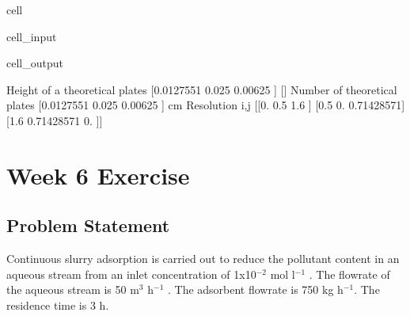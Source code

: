 \documentclass[letterpaper,10pt,english]{jupyterBook}
\begin{document}
\begin{sphinxuseclass}{cell}
\begin{sphinxVerbatimInput}
\begin{sphinxuseclass}{cell_input}
\begin{sphinxVerbatim}[commandchars=\\\{\}]
\end{sphinxVerbatim}

\end{sphinxuseclass}\end{sphinxVerbatimInput}
\begin{sphinxVerbatimOutput}

\begin{sphinxuseclass}{cell_output}
\begin{sphinxVerbatim}[commandchars=\\\{\}]
Height of a theoretical plates  [0.0127551 0.025     0.00625  ]  [\PYGZhy{}]
Number of theoretical plates  [0.0127551 0.025     0.00625  ]  cm
Resolution i,j
 [[0.         0.5        1.6       ]
 [0.5        0.         0.71428571]
 [1.6        0.71428571 0.        ]]
\end{sphinxVerbatim}

\end{sphinxuseclass}\end{sphinxVerbatimOutput}

\end{sphinxuseclass}
\sphinxstepscope


\section{Week 6 \sphinxhyphen{} Exercise}
\label{\detokenize{Exercise_W6_2021:week-6-exercise}}\label{\detokenize{Exercise_W6_2021::doc}}

\subsection{Problem Statement}
\label{\detokenize{Exercise_W6_2021:problem-statement}}
\sphinxAtStartPar
Continuous slurry adsorption is carried out to reduce the pollutant content in an aqueous stream from an inlet concentration of 1x10\(^{-2}\) mol l\(^{-1}\) . The flowrate of the aqueous stream is 50 m\(^3\) h\(^{-1}\) .
The adsorbent flowrate is 750 kg h\(^{-1}\). The residence time is 3 h.
\end{document}
